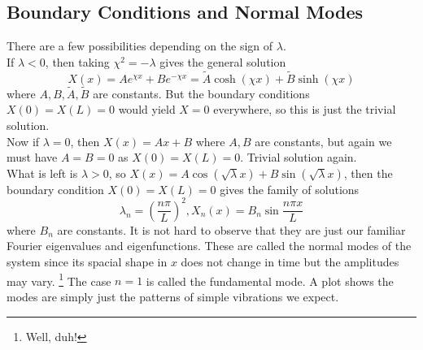 \subsection{Boundary Conditions and Normal Modes}
There are a few possibilities depending on the sign of $\lambda$.\\
If $\lambda<0$, then taking $\chi^2=-\lambda$ gives the general solution
$$X(x)=Ae^{\chi x}+Be^{-\chi x}=\tilde{A}\cosh(\chi x)+\tilde{B}\sinh(\chi x)$$
where $A,B,\tilde{A},\tilde{B}$ are constants.
But the boundary conditions $X(0)=X(L)=0$ would yield $X=0$ everywhere, so this is just the trivial solution.\\
Now if $\lambda=0$, then $X(x)=Ax+B$ where $A,B$ are constants, but again we must have $A=B=0$ as $X(0)=X(L)=0$.
Trivial solution again.\\
What is left is $\lambda>0$, so $X(x)=A\cos(\sqrt{\lambda}x)+B\sin(\sqrt{\lambda}x)$, then the boundary condition $X(0)=X(L)=0$ gives the family of solutions
$$\lambda_n=\left( \frac{n\pi}{L} \right)^2,X_n(x)=B_n\sin\frac{n\pi x}{L}$$
where $B_n$ are constants.
It is not hard to observe that they are just our familiar Fourier eigenvalues and eigenfunctions.
These are called the normal modes of the system since its spacial shape in $x$ does not change in time but the amplitudes may vary.
\footnote{Well, duh!}
The case $n=1$ is called the fundamental mode.
A plot shows the modes are simply just the patterns of simple vibrations we expect.
